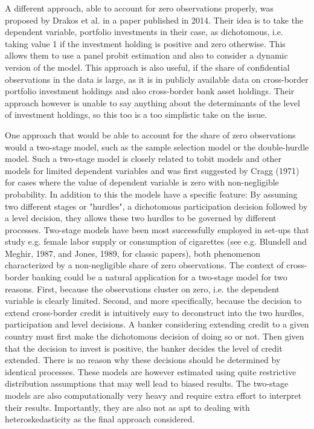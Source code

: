 \documentclass[12pt,a4paper]{article}
\begin{document}
A different approach, able to account for zero observations properly, was proposed by Drakos et al. in a paper published in 2014. Their idea is to take the dependent variable, portfolio investments in their case, as dichotomous, i.e. taking value 1 if the investment holding is positive and zero otherwise. This allows them to use a panel probit estimation and also to consider a dynamic version of the model. This approach is also useful, if the share of confidential observations in the data is large, as it is in publicly available data on cross-border portfolio investment holdings and also cross-border bank asset holdings. Their approach however is unable to say anything about the determinants of the level of investment holdings, so this too is a too simplistic take on the issue.

One approach that would be able to account for the share of zero observations would a two-stage model, such as the sample selection model or the double-hurdle model. Such a two-stage model is closely related to tobit models and other models for limited dependent variables and was first suggested by Cragg (1971) for cases where the value of dependent variable is zero with non-negligible probability. In addition to this the models have a specific feature: By assuming two different stages or "hurdles", a dichotomous participation decision followed by a level decision, they allows these two hurdles to be governed by different processes. Two-stage models have been most successfully employed in set-ups that study e.g. female labor supply or consumption of cigarettes (see e.g. Blundell and Meghir, 1987, and Jones, 1989, for classic papers), both phenomenon characterized by a non-negligible share of zero observations. The context of cross-border banking could be a natural application for a two-stage model for two reasons. First, because the observations cluster on zero, i.e. the dependent variable is clearly limited. Second, and more specifically, because the decision to extend cross-border credit is intuitively easy to deconstruct into the two hurdles, participation and level decisions. A banker considering extending credit to a given country must first make the dichotomous decision of doing so or not. Then given that the decision to invest is positive, the banker decides the level of credit extended. There is no reason why these decisions should be determined by identical processes. These models are however estimated using quite restrictive distribution assumptions that may well lead to biased results. The two-stage models are also computationally very heavy and require extra effort to interpret their results. Importantly, they are also not as apt to dealing with heteroskedasticity as the final approach considered. 
\end{document}
